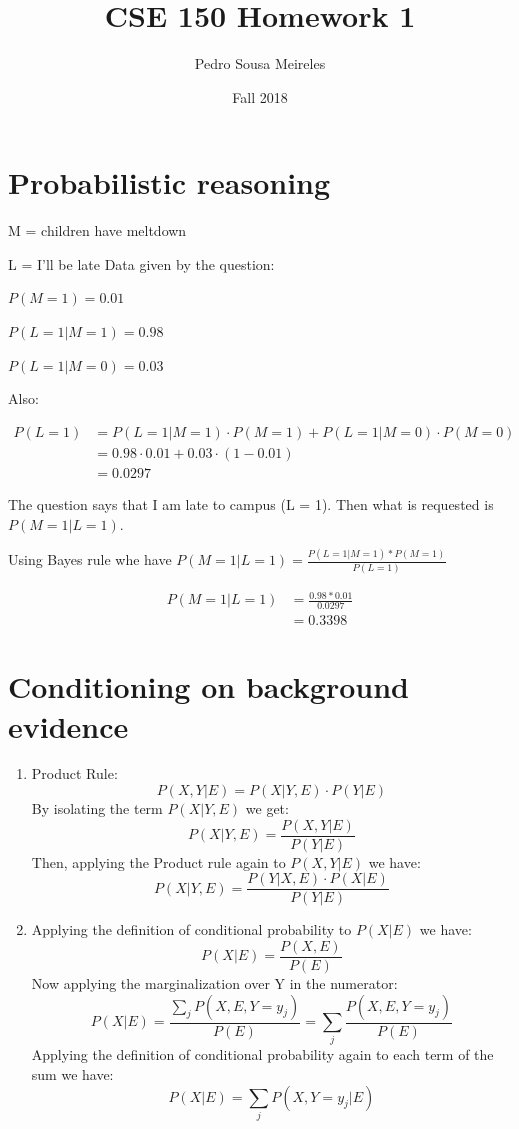 \documentclass{article}
\title{CSE 150 Homework 1}
\date{Fall 2018}
\author{Pedro Sousa Meireles}
\begin{document}
\maketitle
\section{Probabilistic reasoning}

\flushleft M = children have meltdown

L = I'll be late
\bigbreak
Data given by the question:

$P(M=1) = 0.01$

$P(L=1|M=1) = 0.98$

$P(L=1|M=0) = 0.03$
\bigbreak

Also:

\begin{align*}
P(L=1) &=P(L=1|M=1) \cdot P(M=1)+P(L=1|M=0) \cdot P(M=0)\\
&=0.98 \cdot 0.01 + 0.03 \cdot (1-0.01)\\
&=0.0297
\end{align*}
\bigbreak

The question says that I am late to campus (L = 1). Then what is requested is $P(M=1|L=1)$.

Using Bayes rule whe have $P(M=1|L=1)=\frac{P(L=1|M=1)*P(M=1)}{P(L=1)}$

\begin{align*}
P(M=1|L=1) & = \frac{0.98*0.01}{0.0297}\\
& = 0.3398
\end{align*}

\section{Conditioning on background evidence}

\begin{enumerate}[label=(\alph*)]
\item 
Product Rule: $$P(X, Y|E)=P(X|Y,E) \cdot P(Y|E)$$
By isolating the term $P(X|Y,E)$ we get:
$$P(X|Y,E)=\frac{P(X, Y|E)}{P(Y|E)}$$
Then, applying the Product rule again to $P(X, Y|E)$ we have:
$$P(X|Y,E)=\frac{P(Y|X,E) \cdot P(X|E)}{P(Y|E)}$$

\item
Applying the definition of conditional probability to $P(X|E)$ we have:
$$P(X|E)=\frac{P(X,E)}{P(E)}$$
Now applying the marginalization over Y in the numerator:
$$P(X|E)=\frac{\sum_{j} P(X,E, Y=y_j)}{P(E)}=\sum_{j}\frac{P(X,E, Y=y_j)}{P(E)}$$
Applying the definition of conditional probability again to each term of the sum we have:
$$P(X|E)=\sum_{j}P(X, Y=y_j|E)$$
\end{enumerate}
\end{document}
